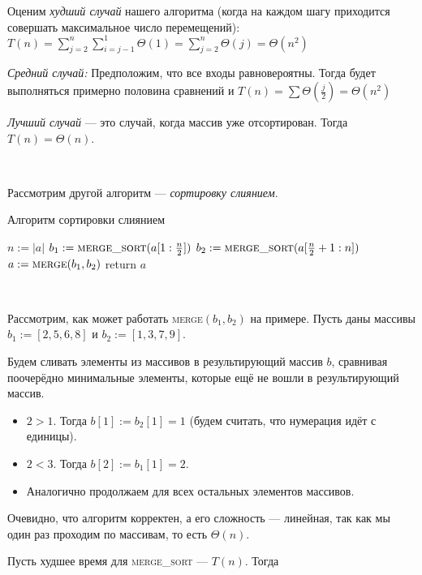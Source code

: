 ﻿\documentclass[12pt,a4paper]{article}
\begin{document}
Оценим \emph{худший случай} нашего алгоритма (когда на каждом шагу приходится совершать максимальное число перемещений): $T(n) = \sum\limits_{j=2}^n\sum\limits_{i=j-1}^1\Theta(1) = \sum\limits_{j=2}^n\Theta(j) = \Theta(n^2)$

\emph{Средний случай:} Предположим, что все входы равновероятны. Тогда будет выполняться примерно половина сравнений и $T(n) = \sum\limits\Theta(\frac{j}{2}) = \Theta(n^2)$

\emph{Лучший случай} --- это случай, когда массив уже отсортирован. Тогда $T(n) = \Theta(n)$.

\

Рассмотрим другой алгоритм --- \emph{сортировку слиянием}.

\begin{algorithm}
\caption{Алгоритм сортировки слиянием}
\begin{algorithmic}[1]
\State $n \mathrel{:=} |a|$
    \State $b_1 \mathrel{:=} \textsc{merge\_sort}(a[1:\frac{n}{2}])$
    \State $b_2 \mathrel{:=} \textsc{merge\_sort}(a[\frac{n}{2}+1:n])$
    \State $a \mathrel{:=} \textsc{merge}(b_1, b_2)$ 
\EndIf
\State return $a$
\EndFunction
\end{algorithmic}
\end{algorithm}

\

Рассмотрим, как может работать \textsc{merge}$(b_1, b_2)$ на примере. Пусть даны массивы $b_1 \mathrel{:=} [2,5,6,8]$ и $b_2 \mathrel{:=} [1,3,7,9]$.

Будем сливать элементы из массивов в результирующий массив $b$, сравнивая поочерёдно минимальные элементы, которые ещё не вошли в результирующий массив. 

\begin{itemize}
    \item $2 > 1$. Тогда $b[1] \mathrel{:=} b_2[1] = 1$ (будем считать, что нумерация идёт с единицы).
    \item $2 < 3$. Тогда $b[2] \mathrel{:=} b_1[1] = 2$.
    \item Аналогично продолжаем для всех остальных элементов массивов.
\end{itemize}
Очевидно, что алгоритм корректен, а его сложность --- линейная, так как мы один раз проходим по массивам, то есть $\Theta(n)$.

Пусть худшее время для \textsc{merge\_sort} --- $T(n)$. Тогда
\end{document}
